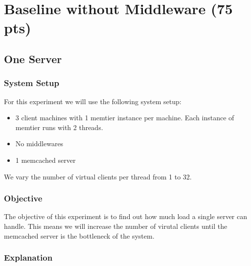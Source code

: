 \documentclass[11pt,a4paper]{article}
\begin{document}
\section{Baseline without Middleware (75 pts)}
%
\subsection{One Server}
%
\subsubsection{System Setup}
%
For this experiment we will use the following system setup:
%
\begin{itemize}
	\item 3 client machines with 1 memtier instance per machine. Each instance of memtier runs with 2 threads.
	\item No middlewares
	\item 1 memcached server
\end{itemize}
%
We vary the number of virtual clients per thread from 1 to 32.
%
\subsubsection{Objective}
%
The objective of this experiment is to find out how much load a single server can handle.
%
This means we will increase the number of virutal clients until the memcached server is the bottleneck of the system.
%
\subsubsection{Explanation}
%
\end{document}
